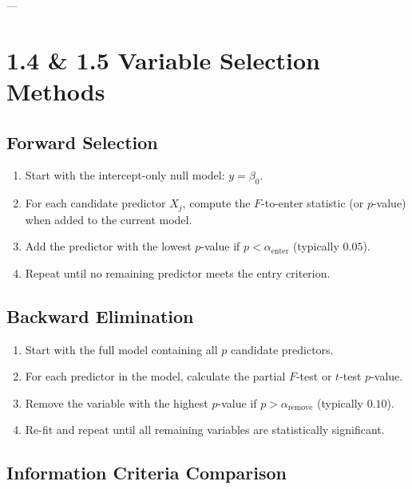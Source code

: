 \documentclass[
]{article}
\begin{document}
---

\textbf{ }

\section{1.4 \& 1.5 Variable Selection Methods}

\textbf{ }

\subsection{Forward Selection}

\begin{enumerate}
\item
  Start with the intercept-only null model: \(y = \beta_{0}\).
\item
  For each candidate predictor \(X_{j}\), compute the \(F\)-to-enter
  statistic (or \(p\)-value) when added to the current model.
\item
  Add the predictor with the lowest \(p\)-value if
  \(p < \alpha_{\text{enter}}\) (typically \(0.05\)).
\item
  Repeat until no remaining predictor meets the entry criterion.
\end{enumerate}

\textbf{ }

\subsection{Backward Elimination}

\begin{enumerate}
\item
  Start with the full model containing all \(p\) candidate predictors.
\item
  For each predictor in the model, calculate the partial \(F\)-test or
  \(t\)-test \(p\)-value.
\item
  Remove the variable with the highest \(p\)-value if
  \(p > \alpha_{\text{remove}}\) (typically \(0.10\)).
\item
  Re-fit and repeat until all remaining variables are statistically
  significant.
\end{enumerate}

\textbf{ }

\subsection{Information Criteria Comparison}
\end{document}
